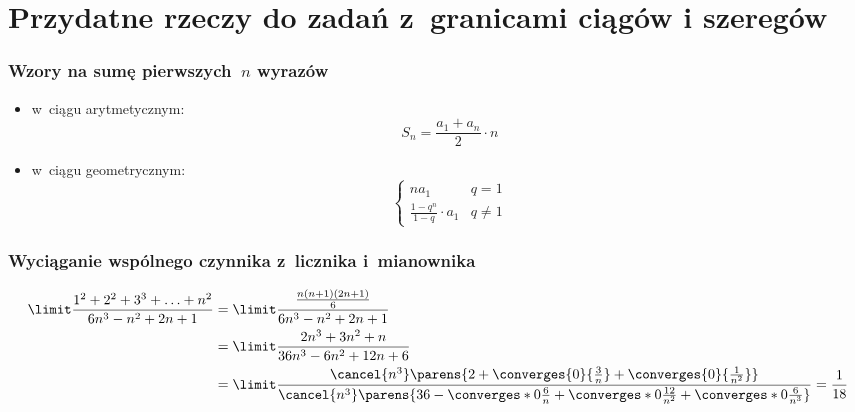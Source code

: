 \section*{Przydatne rzeczy do zadań z~granicami ciągów i szeregów}
\subsubsection*{Wzory na sumę pierwszych~\(n\) wyrazów}
\begin{itemize}
    \item w~ciągu arytmetycznym:
        \begin{equation*}
            S_n = \frac{a_1 + a_n}{2} \cdot n
        \end{equation*}
    \item w~ciągu geometrycznym:
        \begin{equation*}
            \begin{cases}
                na_1 & q = 1\\
                \frac{1 - q^n}{1 - q} \cdot a_1 & q \neq 1
            \end{cases}
        \end{equation*}
\end{itemize}
\subsubsection*{Wyciąganie wspólnego czynnika z~licznika i~mianownika}
\begin{equation*}
    \begin{split}
        \limit \frac{1^2 + 2^2 + 3^3 + \ldots + n^2}{6n^3 - n^2 + 2n + 1} &= \limit \frac{\frac{n(n+1)(2n+1)}{6}}{6n^3 - n^2 + 2n + 1}\\
            &= \limit \frac{2n^3 + 3n^2 + n}{36n^3 - 6n^2 + 12n + 6}\\
            &= \limit \frac{\cancel{n^3}\parens{2 + \converges{0}{\frac{3}{n}} + \converges{0}{\frac{1}{n^2}}}}{\cancel{n^3}\parens{36 - \converges*{0}{\frac{6}{n}} + \converges*{0}{\frac{12}{n^2}} + \converges*{0}{\frac{6}{n^3}}}} = \frac{1}{18}
    \end{split}
\end{equation*}
